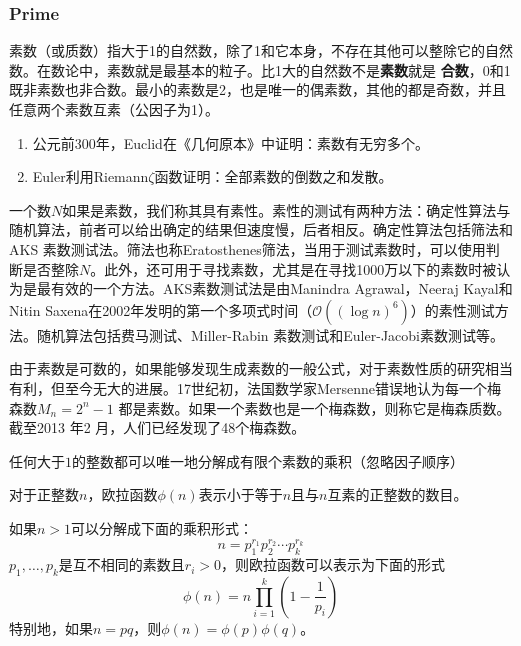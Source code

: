 \subsubsection{Prime}
素数（或质数）指大于1的自然数，除了1和它本身，不存在其他可以整除它的自然数。在数论中，素数就是最基本的粒子。比1大的自然数不是\textbf{素数}就是
\textbf{合数}，0和1 既非素数也非合数。最小的素数是2，也是唯一的偶素数，其他的都是奇数，并且任意两个素数互素（公因子为1）。

\begin{enumerate}
  \item 公元前300年，Euclid在《几何原本》中证明：素数有无穷多个。
  \item Euler利用Riemann$\zeta$函数证明：全部素数的倒数之和发散。
\end{enumerate}

一个数$N$如果是素数，我们称其具有素性。素性的测试有两种方法：确定性算法与随机算法，前者可以给出确定的结果但速度慢，后者相反。确定性算法包括筛法和AKS 素数测试法。筛法也称Eratosthenes筛法，当用于测试素数时，可以使用判断是否整除$N$。此外，还可用于寻找素数，尤其是在寻找1000万以下的素数时被认为是最有效的一个方法。AKS素数测试法是由Manindra Agrawal，Neeraj Kayal和Nitin Saxena在2002年发明的第一个多项式时间（$\mathcal{O}((\log n)^6)$）的素性测试方法。随机算法包括费马测试、Miller-Rabin 素数测试和Euler-Jacobi素数测试等。

由于素数是可数的，如果能够发现生成素数的一般公式，对于素数性质的研究相当有利，但至今无大的进展。17世纪初，法国数学家Mersenne错误地认为每一个梅森数$M_n=2^n-1$ 都是素数。如果一个素数也是一个梅森数，则称它是梅森质数。截至2013 年2 月，人们已经发现了48个梅森数。

\begin{theorem}[唯一分解定理]
    任何大于$1$的整数都可以唯一地分解成有限个素数的乘积（忽略因子顺序）
\end{theorem}

\begin{definition}[欧拉函数]
    对于正整数$n$，欧拉函数$\phi(n)$表示小于等于$n$且与$n$互素的正整数的数目。
\end{definition}

如果$n>1$可以分解成下面的乘积形式：
\begin{equation}
    n = p_1^{r_1} p_2^{r_2} \cdots p_k^{r_k}
\end{equation}
$p_1,\ldots,p_k$是互不相同的素数且$r_i>0$，则欧拉函数可以表示为下面的形式
\begin{equation}
    \phi(n) = n \prod\limits_{i=1}^k (1-\frac{1}{p_i})
\end{equation}
特别地，如果$n=pq$，则$\phi(n)=\phi(p)\phi(q)$。

